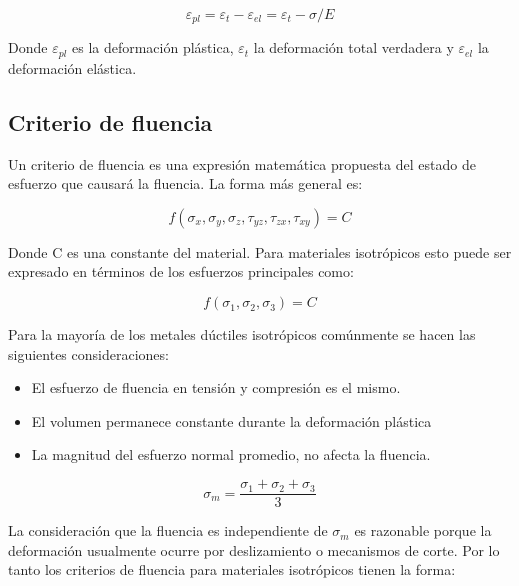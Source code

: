 \begin{equation} \label{eq:plastic_strain}
\varepsilon_{pl} = \varepsilon_t - \varepsilon_{el} = \varepsilon_t - \sigma/E
\end{equation}

Donde $\varepsilon_{pl}$ es la deformación plástica, $\varepsilon_t$ la deformación total verdadera y 
$\varepsilon_{el}$ la deformación elástica.


\subsection{Criterio de fluencia}

Un criterio de fluencia es una expresión matemática propuesta del estado de esfuerzo que causará 
la fluencia. La forma más general es: ~\cite{hosford2005}

\begin{equation}
f(\sigma_x,\sigma_y, \sigma_z, \tau_{yz}, \tau_{zx}, \tau_{xy} ) = C 
\end{equation}

Donde C es una constante del material. Para materiales isotrópicos esto puede ser expresado en 
términos de los esfuerzos principales como: ~\cite{hosford2005}

\begin{equation}
f(\sigma_1,\sigma_2,\sigma_3 )=C
\end{equation}

Para la mayoría de los metales dúctiles isotrópicos comúnmente se hacen las siguientes 
consideraciones: ~\cite{hosford2007}


\begin{itemize}
\item El esfuerzo de fluencia en tensión y compresión es el mismo.
\item El volumen permanece constante durante la deformación plástica
\item La magnitud del esfuerzo normal promedio, no afecta la fluencia.
\end{itemize}

\begin{equation}
\sigma_m=\frac{\sigma_1+\sigma_2+\sigma_3}{3}
\end{equation}

La consideración que la fluencia es independiente de $\sigma_m$ es razonable porque la deformación 
usualmente ocurre por deslizamiento o mecanismos de corte. Por lo tanto los criterios de fluencia 
para materiales isotrópicos tienen la forma: ~\cite{hosford2007}

